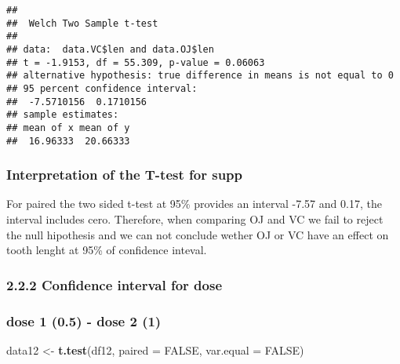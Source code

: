 \documentclass[]{article}
\newenvironment{Shaded}{\begin{snugshade}}{\end{snugshade}}
\newcommand{\DataTypeTok}[1]{\textcolor[rgb]{0.13,0.29,0.53}{#1}}
\newcommand{\KeywordTok}[1]{\textcolor[rgb]{0.13,0.29,0.53}{\textbf{#1}}}
\newcommand{\NormalTok}[1]{#1}
\newcommand{\OperatorTok}[1]{\textcolor[rgb]{0.81,0.36,0.00}{\textbf{#1}}}
\newcommand{\OtherTok}[1]{\textcolor[rgb]{0.56,0.35,0.01}{#1}}
\newcommand{\StringTok}[1]{\textcolor[rgb]{0.31,0.60,0.02}{#1}}
\begin{document}
\begin{Shaded}
\end{Shaded}

\begin{verbatim}
## 
##  Welch Two Sample t-test
## 
## data:  data.VC$len and data.OJ$len
## t = -1.9153, df = 55.309, p-value = 0.06063
## alternative hypothesis: true difference in means is not equal to 0
## 95 percent confidence interval:
##  -7.5710156  0.1710156
## sample estimates:
## mean of x mean of y 
##  16.96333  20.66333
\end{verbatim}

\hypertarget{interpretation-of-the-t-test-for-supp}{%
\subsubsection{Interpretation of the T-test for
supp}\label{interpretation-of-the-t-test-for-supp}}

For paired the two sided t-test at 95\% provides an interval -7.57 and
0.17, the interval includes cero. Therefore, when comparing OJ and VC we
fail to reject the null hipothesis and we can not conclude wether OJ or
VC have an effect on tooth lenght at 95\% of confidence inteval.

\hypertarget{confidence-interval-for-dose}{%
\subsubsection{2.2.2 Confidence interval for
dose}\label{confidence-interval-for-dose}}

\hypertarget{dose-1-0.5---dose-2-1}{%
\subsubsection{dose 1 (0.5) - dose 2 (1)}\label{dose-1-0.5---dose-2-1}}

\begin{Shaded}
\begin{Highlighting}[]
\NormalTok{data12 <-}\StringTok{ }\KeywordTok{t.test}\NormalTok{(df12, }\DataTypeTok{paired =} \OtherTok{FALSE}\NormalTok{, }\DataTypeTok{var.equal =} \OtherTok{FALSE}\NormalTok{)}
\end{Highlighting}
\end{Shaded}
\end{document}
